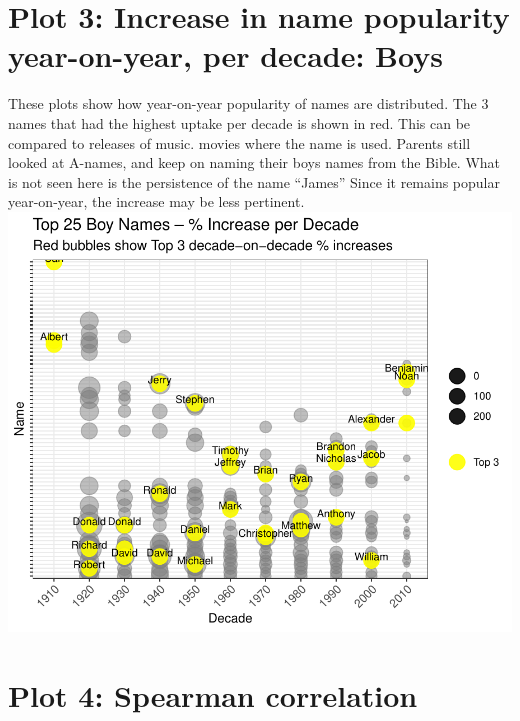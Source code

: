 \documentclass[11pt,preprint]{elsarticle}
\numberwithin{equation}{section}
\numberwithin{figure}{section}
\numberwithin{table}{section}
\begin{document}
\section{Plot 3: Increase in name popularity year-on-year, per decade:
Boys}\label{plot-3-increase-in-name-popularity-year-on-year-per-decade-boys}

These plots show how year-on-year popularity of names are distributed.
The 3 names that had the highest uptake per decade is shown in red. This
can be compared to releases of music. movies where the name is used.
Parents still looked at A-names, and keep on naming their boys names
from the Bible. What is not seen here is the persistence of the name
``James'' Since it remains popular year-on-year, the increase may be
less pertinent.
\includegraphics{Question1_files/figure-latex/unnamed-chunk-3-1.pdf}

\newpage

\section{Plot 4: Spearman
correlation}\label{plot-4-spearman-correlation}
\end{document}
